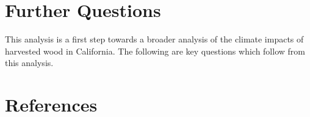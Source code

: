 \documentclass[a4paper]{article}
\begin{document}
\section{Further Questions}
\label{sec:orgheadline21}

This analysis is a first step towards a broader analysis of the
climate impacts of harvested wood in California. The following are key
questions which follow from this analysis.

\section{References}
\label{sec:orgheadline22}


\end{document}
